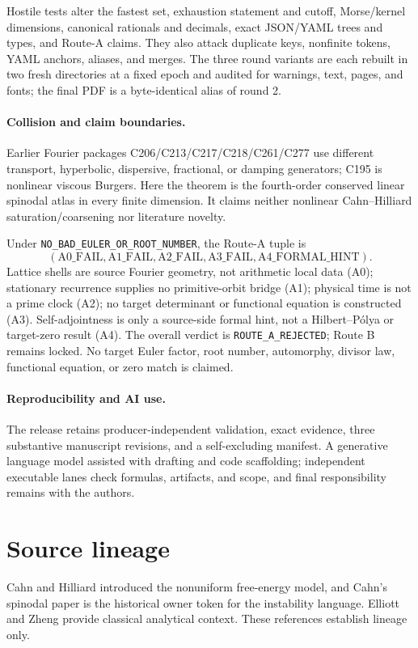 \documentclass[10pt]{article}
\begin{document}
Hostile tests alter the fastest set, exhaustion statement and cutoff,
Morse/kernel dimensions, canonical rationals and decimals, exact JSON/YAML
trees and types, and Route-A claims. They also attack duplicate keys,
nonfinite tokens, YAML anchors, aliases, and merges. The three round variants
are each rebuilt in two fresh directories at a fixed epoch and audited for
warnings, text, pages, and fonts; the final PDF is a byte-identical alias of
round 2.

\paragraph{Collision and claim boundaries.}
Earlier Fourier packages C206/C213/C217/C218/C261/C277 use different
transport, hyperbolic, dispersive, fractional, or damping generators; C195
is nonlinear viscous Burgers. Here the theorem is the fourth-order conserved
linear spinodal atlas in every finite dimension. It claims neither nonlinear
Cahn--Hilliard saturation/coarsening nor literature novelty.

Under \texttt{NO\_BAD\_EULER\_OR\_ROOT\_NUMBER}, the Route-A tuple is
\[
 (\mathrm{A0\_FAIL},\mathrm{A1\_FAIL},\mathrm{A2\_FAIL},
   \mathrm{A3\_FAIL},\mathrm{A4\_FORMAL\_HINT}).
\]
Lattice shells are source Fourier geometry, not arithmetic local data (A0);
stationary recurrence supplies no primitive-orbit bridge (A1); physical time
is not a prime clock (A2); no target determinant or functional equation is
constructed (A3). Self-adjointness is only a source-side formal hint, not a
Hilbert--P\'olya or target-zero result (A4). The overall verdict is
\texttt{ROUTE\_A\_REJECTED}; Route B remains locked. No target Euler factor,
root number, automorphy, divisor law, functional equation, or zero match is
claimed.

\paragraph{Reproducibility and AI use.}
The release retains producer-independent validation, exact evidence, three
substantive manuscript revisions, and a self-excluding manifest. A
generative language model assisted with drafting and code scaffolding;
independent executable lanes check formulas, artifacts, and scope, and final
responsibility remains with the authors.
\fi

\section*{Source lineage}
Cahn and Hilliard introduced the nonuniform free-energy model, and Cahn's
spinodal paper is the historical owner token for the instability language.
Elliott and Zheng provide classical analytical context. These references
establish lineage only.
\end{document}
